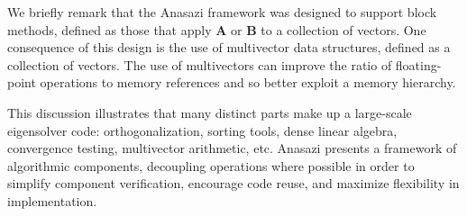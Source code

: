 \documentclass[acmtoms]{acmtrans2m}
\newcounter{algorithm}
\begin{document}
We briefly remark that the Anasazi framework was designed to support block methods,
defined as those that apply $\mathbf{A}$ or $\mathbf{B}$ to a collection of vectors. One
consequence of this design is the use of multivector data structures, defined as a
collection of vectors. The use of multivectors can improve the ratio of floating-point
operations to memory references and so better exploit a memory hierarchy.

This discussion illustrates that many distinct parts make up a
large-scale eigensolver code: orthogonalization, sorting tools, dense
linear algebra, convergence testing, multivector arithmetic, etc.
Anasazi presents a framework of algorithmic components, decoupling
operations where possible in order to simplify component verification,
encourage code reuse, and maximize flexibility in implementation.

\end{document}
